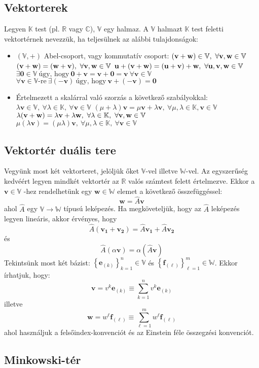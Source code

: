 \subsection{Vektorterek}
Legyen $\mathbb{K}$ test (pl. $\mathbb{R}$ vagy $\mathbb{C}$), $\mathbb{V}$ egy halmaz. A $\mathbb{V}$ halmazt $\mathbb{K}$ test feletti
vektortérnek nevezzük, ha teljesülnek az alábbi tulajdonságok:
\begin{itemize}
\item $(\mathbb{V}, +)$ Abel-csoport, vagy kommutatív csoport:
\subitem $(\mathbf{v} + \mathbf{w}) \in \mathbb{V}, ~ \forall \mathbf{v}, \mathbf{w} \in \mathbb{V}$
\subitem $(\mathbf{v} + \mathbf{w}) = (\mathbf{w} + \mathbf{v}), ~ \forall \mathbf{v}, \mathbf{w} \in \mathbb{V}$
\subitem $\mathbf{u} + (\mathbf{v} + \mathbf{w}) =(\mathbf{u} + \mathbf{v}) + \mathbf{w}, ~ \forall \mathbf{u},\mathbf{v}, \mathbf{w} \in \mathbb{V}$
\subitem $\exists \mathbf{0} \in \mathbb{V} ~ \textrm{úgy, hogy} ~ \mathbf{0} + \mathbf{v} = \mathbf{v} + \mathbf{0} = \mathbf{v} ~ \forall \mathbf{v}\in\mathbb{V}$
\subitem $ \forall \mathbf{v}\in\mathbb{V}\textrm{-re} ~ \exists (-\mathbf{v}) ~ \textrm{úgy, hogy} ~  \mathbf{v}+(-\mathbf{v})=\mathbf{0}$

\item Értelmezett a skalárral való szorzás a következő szabályokkal:
\subitem $\lambda \mathbf{v} \in \mathbb V, ~ \forall \lambda \in \mathbb{K}, ~ \forall \mathbf{v} \in \mathbb{V}$
\subitem $(\mu + \lambda) \mathbf{v} = \mu \mathbf{v} + \lambda\mathbf{v} , ~ \forall \mu, \lambda \in \mathbb{K}, \mathbf{v} \in \mathbb{V}$
\subitem $\lambda (\mathbf{v} + \mathbf{w}) = \lambda \mathbf{v} + \lambda \mathbf{w}, ~ \forall \lambda \in \mathbb{K}, ~ \forall \mathbf{v}, \mathbf{w} \in \mathbb{V}$
\subitem $\mu (\lambda \mathbf{v}) = (\mu \lambda)\mathbf{v} , ~ \forall \mu, \lambda \in \mathbb{K},~ \forall \mathbf{v} \in \mathbb{V}$

\end{itemize}

\subsection{Vektortér duális tere}
Vegyünk most két vektorteret, jelöljük őket $\mathbb{V}$-vel illetve $\mathbb{W}$-vel. Az egyszerűség kedvéért
legyen mindkét vektortér az $\mathbb{R}$ valós számtest felett értelmezve. Ekkor a $\mathbf{v} \in \mathbb{V}$ -hez rendelhetünk
egy $\mathbf{w} \in \mathbb{W}$ elemet a következő összefüggéssel:
\[ \mathbf{w} = \hat{A}\mathbf{v} \]
ahol $\hat{A}$ egy $\mathbb{V} \rightarrow \mathbb{W}$ típusú leképezés.
Ha megköveteljük, hogy az $\hat{A}$ leképezés legyen lineáris, akkor érvényes, hogy
\[ \hat{A}(\mathbf{v_1} + \mathbf{v_2}) = \hat{A}\mathbf{v_1} + \hat{A}\mathbf{v_2} \]
és
\[ \hat{A}(\alpha\mathbf{v}) = \alpha(\hat{A}\mathbf{v}) \]
Tekintsünk most két bázist: $\left \{ \mathbf{e}_{(k)} \right \} _{k=1}^n \in \mathbb{V}$ és $\left \{ \mathbf{f}_{(\ell)} \right \} _{\ell=1}^m \in \mathbb{W}$.
Ekkor írhatjuk, hogy:
\[ \mathbf{v} = v^k\mathbf{e}_{(k)} \equiv \sum\limits_{k=1}^n v^k\mathbf{e}_{(k)}  \] illetve
\[ \mathbf{w} = w^\ell \mathbf{f}_{(\ell)} \equiv \sum\limits_{\ell=1}^m w^\ell \mathbf{f}_{(\ell)}  \]
ahol használjuk a felsőindex-konvenciót és az Einstein féle összegzési konvenciót.

\subsection{Minkowski-tér}
